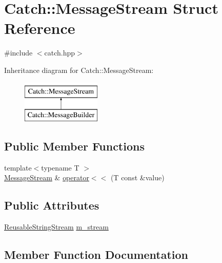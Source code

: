 \hypertarget{struct_catch_1_1_message_stream}{}\section{Catch\+::Message\+Stream Struct Reference}
\label{struct_catch_1_1_message_stream}


{\ttfamily \#include $<$catch.\+hpp$>$}

Inheritance diagram for Catch\+::Message\+Stream\+:\begin{figure}[H]
\begin{center}
\leavevmode
\includegraphics[height=2.000000cm]{struct_catch_1_1_message_stream}
\end{center}
\end{figure}
\subsection*{Public Member Functions}
\begin{DoxyCompactItemize}
\item 
{\footnotesize template$<$typename T $>$ }\\\mbox{\hyperlink{struct_catch_1_1_message_stream}{Message\+Stream}} \& \mbox{\hyperlink{struct_catch_1_1_message_stream_a554c4aff5925a077e9fe9d858217428d}{operator$<$$<$}} (T const \&value)
\end{DoxyCompactItemize}
\subsection*{Public Attributes}
\begin{DoxyCompactItemize}
\item 
\mbox{\hyperlink{class_catch_1_1_reusable_string_stream}{Reusable\+String\+Stream}} \mbox{\hyperlink{struct_catch_1_1_message_stream_a9202520faed8882ef469db9f353ec578}{m\+\_\+stream}}
\end{DoxyCompactItemize}


\subsection{Member Function Documentation}
\mbox{\label{struct_catch_1_1_message_stream_a554c4aff5925a077e9fe9d858217428d}} 
